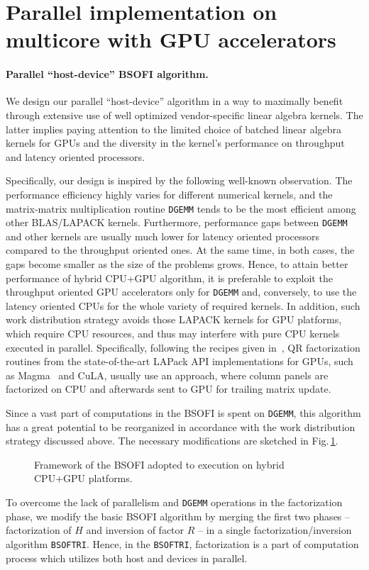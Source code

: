\documentclass{llncs}
\newcommand{\Lapack}{{\sc LAPack}\xspace}
\newcommand{\Magma}{{\sc Magma}\xspace}
\newcommand{\Cula}{{\sc CuLA}\xspace}
\newcommand{\Bsoftri}{\texttt{BSOFTRI}\xspace}
\begin{document}
\section{Parallel implementation on multicore with GPU accelerators}
\label{sec:implementation_on_CPU+GPU}

\paragraph%
{Parallel ``host-device'' BSOFI algorithm.}\label{sec:alrorithms_for_accelerators}

We design our parallel ``host-device'' algorithm in a way to maximally benefit 
through extensive use of well optimized vendor-specific 
linear algebra kernels.
The latter implies paying attention to 
the limited choice of batched linear algebra kernels for GPUs
and the diversity in the kernel's performance on throughput and latency oriented processors.

Specifically, our design is inspired by the following well-known observation.
The performance efficiency
highly varies for different numerical kernels, 
and the matrix-matrix multiplication routine {\tt DGEMM}
tends to be the most efficient among other BLAS/LAPACK kernels. 
Furthermore, performance gaps between {\tt DGEMM} and other kernels
are usually much lower for 
latency oriented processors compared to the throughput oriented ones.
At the same time, in both cases, the gaps become smaller 
as the size of the problems grows.
Hence, 
to attain better performance of hybrid CPU+GPU algorithm, 
it is preferable to exploit 
the throughput oriented GPU accelerators only for {\tt DGEMM}
and, conversely, 
to use the latency oriented CPUs for the whole variety of required kernels.
In addition, such work distribution strategy
avoids those LAPACK kernels for GPU platforms,
which require CPU resources, 
and thus may 
interfere with pure CPU kernels
executed in parallel.
Specifically, %
following the recipes given in~\cite{Volkov08LU_QR_Cholesky},
QR factorization routines 
from the state-of-the-art \Lapack API implementations for GPUs,
such as \Magma~\cite{Tomov10Magma} and
\Cula,
usually use an approach, 
where column panels are factorized on CPU 
and afterwards sent to GPU for trailing matrix update.

Since 
a vast part of computations in the BSOFI is spent on {\tt DGEMM},
this algorithm has a great potential to be reorganized 
in accordance with the work distribution strategy discussed above.
The necessary modifications are sketched in Fig.\,\ref{fig:BSOFI_HostDevice}. 
\begin{figure}[t]%
  \scalebox{0.75}{
    
  }
  \caption{Framework of the BSOFI
    adopted to execution on hybrid CPU+GPU platforms.%
    \label{fig:BSOFI_HostDevice}}
\end{figure}
To overcome the lack of parallelism and {\tt DGEMM} operations 
in the factorization phase,
we modify the basic BSOFI algorithm 
by merging the first two phases -- 
factorization of $H$ and inversion of factor $R$ -- 
in a single factorization/inversion algorithm \Bsoftri. 
Hence, in the \Bsoftri,
factorization is a part of computation process which
utilizes both host and devices in parallel.
\end{document}
